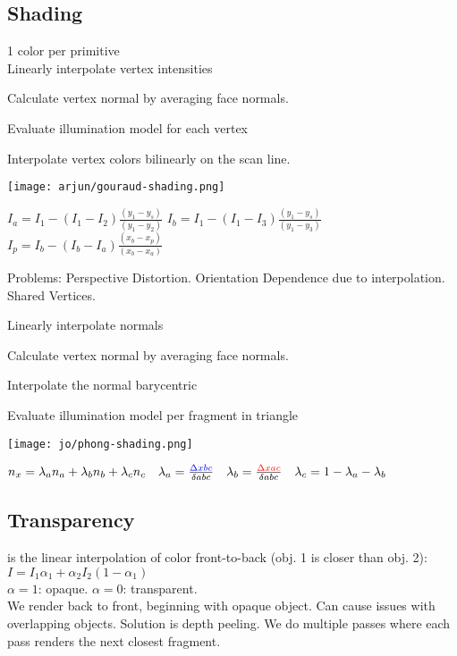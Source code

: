 \subsection*{Shading}
 1 color per primitive \\
 Linearly interpolate vertex intensities
\begin{compactenum}
    \item Calculate vertex normal by averaging face normals.
    \item Evaluate illumination model for each vertex
    \item Interpolate vertex colors bilinearly on the scan line.
\end{compactenum}
\begin{center}
    \texttt{[image: arjun/gouraud-shading.png]}
\end{center}

$I_a = I_1 - (I_1 - I_2)\frac{(y_1-y_s)}{(y_1 - y_2)}$  
$I_b = I_1 - \left(I_1 - I_3\right) \frac{\left(y_1 - y_s\right)}{\left(y_1 - y_3\right)}$ 
$I_p = I_b - \left(I_b - I_a\right) \frac{\left(x_b - x_p\right)}{\left(x_b - x_a\right)}
$

Problems: Perspective Distortion. Orientation Dependence due to interpolation. Shared Vertices.

 Linearly interpolate normals
\begin{compactenum}
    \item Calculate vertex normal by averaging face normals.
    \item Interpolate the normal barycentric
    \item Evaluate illumination model per fragment in triangle
\end{compactenum}
\begin{center}
    \texttt{[image: jo/phong-shading.png]}
\end{center}

$ n_x = \lambda_an_a + \lambda_bn_b + \lambda_cn_c  \quad \lambda_a = \frac{\color{blue} \Delta xbc}{\delta abc} \quad \lambda_b = \frac{\color{red} \Delta xac}{\delta abc} \quad \lambda_c = 1 - \lambda_a - \lambda_b$ 

\subsection*{Transparency}
 is the linear interpolation of color front-to-back (obj. 1 is closer than obj. 2): $I = I_1 \alpha_1 + \alpha_2 I_2 (1 - \alpha_1)$\\
$\alpha = 1 $: opaque. $\alpha = 0$: transparent.\\
We render back to front, beginning with opaque object. Can cause issues with overlapping objects. Solution is depth peeling. We do multiple passes where each pass renders the next closest fragment.